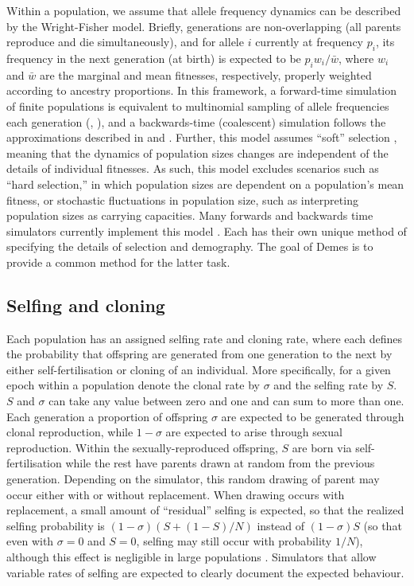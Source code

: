 \documentclass[11pt]{article}
\begin{document}
Within a population, we assume that allele frequency dynamics can
be described by the Wright-Fisher model.
Briefly, generations are non-overlapping (all parents
reproduce and die simultaneously), and for allele $i$ currently at frequency $p_i$,
its frequency in the next generation (at birth) is expected to be $p_iw_i/\bar{w}$,
where $w_i$ and $\bar{w}$ are the marginal and
mean fitnesses, respectively, properly weighted according to ancestry proportions.
In this framework,
a forward-time simulation of finite populations is equivalent
to multinomial sampling of allele frequencies each
generation (\citet[][pp 29-31]{burger2000-ul}, \citet[][pp 179-181]{crowkimura1970}),
and a backwards-time (coalescent) simulation follows the approximations
described in \citet{tajima1983evolutionary,hudson1983testing}
and \citet[][chapter 3]{wakeley2008-hd}.
Further, this model assumes ``soft'' selection \citep{christiansen1975hard},
meaning that the dynamics of population sizes
changes are independent of the details of individual fitnesses.
As such, this model excludes scenarios such as ``hard selection,''
in which population sizes are dependent on a population's mean fitness, or
stochastic fluctuations in population size, such as interpreting
population sizes as carrying capacities.
Many forwards and backwards time simulators currently implement this model
\citep[e.g.,][]{hudson2002generating,gutenkunst2009inferring,excoffier2011fastsimcoal,kelleher2016efficient,jouganous2017inferring,haller2019slim,thornton2019-nu}.
Each has their own unique method of specifying the details of selection and demography.
The goal of Demes is to provide a common method for the latter task.

\subsection{Selfing and cloning}

Each population has an assigned selfing rate and cloning rate, where each defines
the probability that offspring are generated from one generation to the next by either
self-fertilisation or cloning of an individual.
More specifically, for a given epoch within a population denote the clonal rate by
$\sigma$ and the selfing rate by $S$.
$S$ and $\sigma$ can take any value between zero and one and
can sum to more than one.
Each generation a proportion of offspring
$\sigma$ are expected to be generated through clonal reproduction,
while $1-\sigma$ are expected to arise through sexual reproduction.
Within the sexually-reproduced offspring,
$S$ are born via self-fertilisation while the rest
have parents drawn at random from the previous generation.
Depending on the simulator, this random drawing of parent may occur
either with or without replacement. When drawing occurs with replacement, a small
amount of ``residual'' selfing is expected, so that the realized selfing probability
is $(1-\sigma)(S + (1-S)/N)$ instead of $(1-\sigma)S$ (so that even with $\sigma=0$
and $S=0$, selfing may still occur with probability $1/N$), although
this effect is negligible in large populations \citep{nordborg1997coalescent}.
Simulators that allow variable rates of selfing are expected to clearly
document the expected behaviour.
\end{document}
